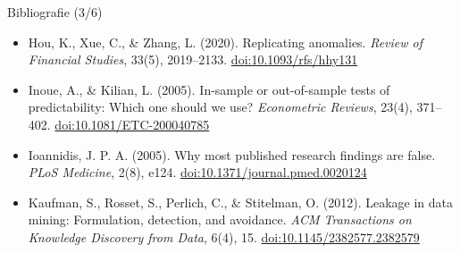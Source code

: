 \begin{frame}{Bibliografie (3/6)}
\begin{itemize}
    \item Hou, K., Xue, C., \& Zhang, L. (2020). Replicating anomalies. \textit{Review of Financial Studies}, 33(5), 2019--2133. \href{https://doi.org/10.1093/rfs/hhy131}{doi:10.1093/rfs/hhy131}
    \item Inoue, A., \& Kilian, L. (2005). In-sample or out-of-sample tests of predictability: Which one should we use? \textit{Econometric Reviews}, 23(4), 371--402. \href{https://doi.org/10.1081/ETC-200040785}{doi:10.1081/ETC-200040785}
    \item Ioannidis, J. P. A. (2005). Why most published research findings are false. \textit{PLoS Medicine}, 2(8), e124. \href{https://doi.org/10.1371/journal.pmed.0020124}{doi:10.1371/journal.pmed.0020124}
    \item Kaufman, S., Rosset, S., Perlich, C., \& Stitelman, O. (2012). Leakage in data mining: Formulation, detection, and avoidance. \textit{ACM Transactions on Knowledge Discovery from Data}, 6(4), 15. \href{https://doi.org/10.1145/2382577.2382579}{doi:10.1145/2382577.2382579}
\end{itemize}
\end{frame}

